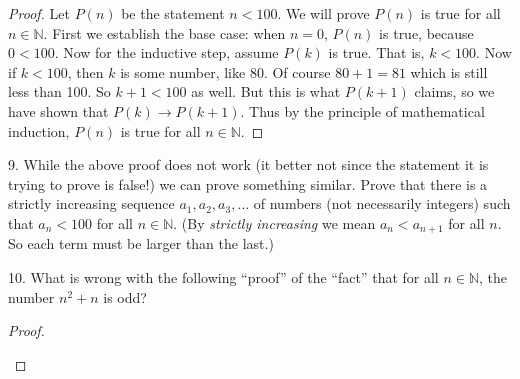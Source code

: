 \documentclass[10pt,]{book}
\theoremstyle{plain}
\theoremstyle{definition}
\theoremstyle{definition}
\theoremstyle{definition}
\numberwithin{equation}{chapter}
\def\N{\mathbb N}
\def\imp{\rightarrow}
\newcommand{\lt}{ < }
\begin{document}
\begin{exerciselist}
\begin{proof}
Let \(P(n)\) be the statement \(n \lt  100\). We will prove \(P(n)\) is true for all \(n \in \N\). First we establish the base case: when \(n = 0\), \(P(n)\) is true, because \(0 \lt  100\). Now for the inductive step, assume \(P(k)\) is true. That is, \(k \lt  100\). Now if \(k \lt  100\), then \(k\) is some number, like 80. Of course \(80+1 = 81\) which is still less than 100. So \(k +1 \lt  100\) as well. But this is what \(P(k+1)\) claims, so we have shown that \(P(k) \imp P(k+1)\). Thus by the principle of mathematical induction, \(P(n)\) is true for all \(n \in \N\).
%
\end{proof}
\par\smallskip
\item[9.]\hypertarget{exercise-176}{}
While the above proof does not work (it better not since the statement it is trying to prove is false!) we can prove something similar. Prove that there is a strictly increasing sequence \(a_1, a_2, a_3, \ldots\) of numbers (not necessarily integers) such that \(a_n \lt  100\) for all \(n \in \N\). (By \emph{strictly increasing} we mean \(a_n \lt  a_{n+1}\) for all \(n\). So each term must be larger than the last.)
%
\par\smallskip
\item[10.]\hypertarget{exercise-177}{}
What is wrong with the following ``proof'' of the ``fact'' that for all \(n \in \N\), the number \(n^2 + n\) is odd?
%
\begin{proof}\hypertarget{proof-28}{}


\end{proof}
\end{exerciselist}
\end{document}
